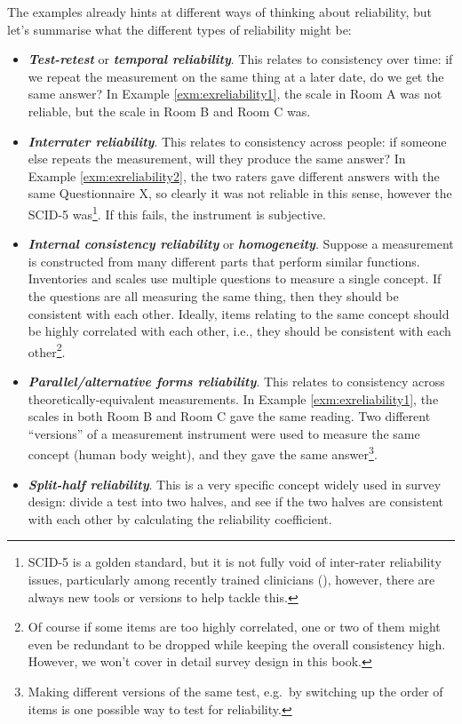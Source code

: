 \documentclass[
  11pt,
  a4paper,
  twoside,symmetric,openright]{book}
\providecommand{\tightlist}{%
  \setlength{\itemsep}{0pt}\setlength{\parskip}{0pt}}
\theoremstyle{break}
\theoremstyle{break}
\begin{document}
The examples already hints at different ways of thinking about reliability, but let's summarise what the different types of reliability might be:

\begin{itemize}
\tightlist
\item
  \textbf{\emph{Test-retest}} or \textbf{\emph{temporal reliability}}. This relates to consistency over time: if we repeat the measurement on the same thing at a later date, do we get the same answer? In Example \ref{exm:exreliability1}, the scale in Room A was not reliable, but the scale in Room B and Room C was.
\item
  \textbf{\emph{Interrater reliability}}. This relates to consistency across people: if someone else repeats the measurement, will they produce the same answer? In Example \ref{exm:exreliability2}, the two raters gave different answers with the same Questionnaire X, so clearly it was not reliable in this sense, however the SCID-5 was\footnote{SCID-5 is a golden standard, but it is not fully void of inter-rater reliability issues, particularly among recently trained clinicians (), however, there are always new tools or versions to help tackle this.}. If this fails, the instrument is subjective.
\item
  \textbf{\emph{Internal consistency reliability}} or \textbf{\emph{homogeneity}}. Suppose a measurement is constructed from many different parts that perform similar functions. Inventories and scales use multiple questions to measure a single concept. If the questions are all measuring the same thing, then they should be consistent with each other. Ideally, items relating to the same concept should be highly correlated with each other, i.e., they should be consistent with each other\footnote{Of course if some items are too highly correlated, one or two of them might even be redundant to be dropped while keeping the overall consistency high. However, we won't cover in detail survey design in this book.}.
\item
  \textbf{\emph{Parallel/alternative forms reliability}}. This relates to consistency across theoretically-equivalent measurements. In Example \ref{exm:exreliability1}, the scales in both Room B and Room C gave the same reading. Two different ``versions'' of a measurement instrument were used to measure the same concept (human body weight), and they gave the same answer\footnote{Making different versions of the same test, e.g.~by switching up the order of items is one possible way to test for reliability.}.
\item
  \textbf{\emph{Split-half reliability}}. This is a very specific concept widely used in survey design: divide a test into two halves, and see if the two halves are consistent with each other by calculating the reliability coefficient.
\end{itemize}
\end{document}

